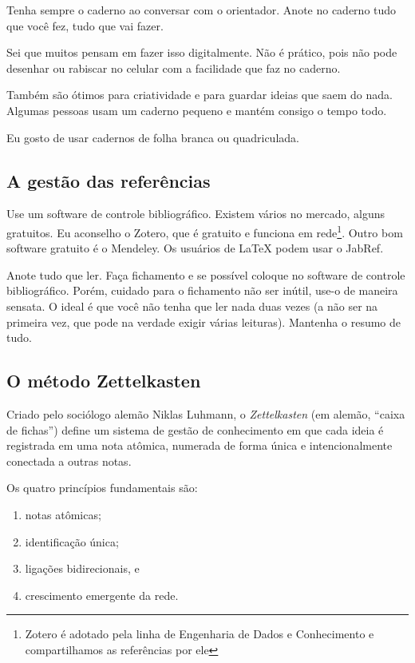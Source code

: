 Tenha sempre o caderno ao conversar com o orientador. Anote no caderno tudo que você fez, tudo que vai fazer.

Sei que muitos pensam em fazer isso digitalmente. Não é prático, pois não pode desenhar ou rabiscar no celular com a facilidade que faz no caderno.

Também são ótimos para criatividade e para guardar ideias que saem do nada. Algumas pessoas usam um caderno pequeno e mantém consigo o tempo todo.

Eu gosto de usar cadernos de folha branca ou quadriculada.

\subsection{A gestão das referências}

Use um software de controle bibliográfico. Existem vários no mercado, alguns gratuitos. Eu aconselho o Zotero, que é gratuito e funciona em rede\footnote{Zotero é adotado pela linha de Engenharia de Dados e Conhecimento e compartilhamos as referências por ele}. Outro bom software gratuito é o Mendeley. Os usuários de LaTeX podem usar o JabRef.

Anote tudo que ler. 
Faça fichamento e se possível coloque no software de controle bibliográfico. 
Porém, cuidado para o fichamento não ser inútil, use-o de maneira sensata.
O ideal é que você não tenha que ler nada duas vezes (a não ser na primeira vez, que pode na verdade exigir várias leituras). 
Mantenha o resumo de tudo. 

\subsection{O método Zettelkasten}

Criado pelo sociólogo alemão Niklas Luhmann, o \emph{Zettelkasten} (em alemão, “caixa de fichas”) define um sistema de gestão de conhecimento em que cada ideia é registrada em uma nota atômica, numerada de forma única e intencionalmente conectada a outras notas\citep{fast2020zettelkasten}.  

Os quatro princípios fundamentais são: 
\begin{enumerate}
    \item notas atômicas; 
    \item identificação única; 
    \item ligações bidirecionais, e 
    \item crescimento emergente da rede.  
\end{enumerate}

